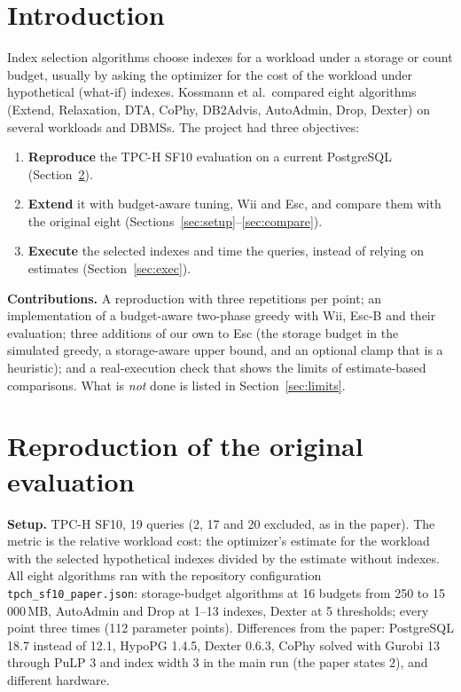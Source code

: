 \documentclass[11pt,a4paper]{article}
\begin{document}
\section{Introduction}
Index selection algorithms choose indexes for a workload under a storage or count budget, usually by asking the optimizer for the cost of the workload under hypothetical (what-if) indexes. Kossmann et al.\ compared eight algorithms (Extend, Relaxation, DTA, CoPhy, DB2Advis, AutoAdmin, Drop, Dexter) on several workloads and DBMSs. The project had three objectives:
\begin{enumerate}
\item \textbf{Reproduce} the TPC-H SF10 evaluation on a current PostgreSQL (Section~\ref{sec:repro}).
\item \textbf{Extend} it with budget-aware tuning, Wii and Esc, and compare them with the original eight (Sections~\ref{sec:setup}--\ref{sec:compare}).
\item \textbf{Execute} the selected indexes and time the queries, instead of relying on estimates (Section~\ref{sec:exec}).
\end{enumerate}
\textbf{Contributions.} A reproduction with three repetitions per point; an implementation of a budget-aware two-phase greedy with Wii, Esc-B and their evaluation; three additions of our own to Esc (the storage budget in the simulated greedy, a storage-aware upper bound, and an optional clamp that is a heuristic); and a real-execution check that shows the limits of estimate-based comparisons. What is \emph{not} done is listed in Section~\ref{sec:limits}.

\section{Reproduction of the original evaluation}\label{sec:repro}
\textbf{Setup.} TPC-H SF10, 19 queries (2, 17 and 20 excluded, as in the paper). The metric is the relative workload cost: the optimizer's estimate for the workload with the selected hypothetical indexes divided by the estimate without indexes. All eight algorithms ran with the repository configuration \texttt{tpch\_sf10\_paper.json}: storage-budget algorithms at 16 budgets from 250 to 15\,000\,MB, AutoAdmin and Drop at 1--13 indexes, Dexter at 5 thresholds; every point three times (112 parameter points). Differences from the paper: PostgreSQL 18.7 instead of 12.1, HypoPG 1.4.5, Dexter 0.6.3, CoPhy solved with Gurobi 13 through PuLP 3 and index width 3 in the main run (the paper states 2), and different hardware.
\end{document}
